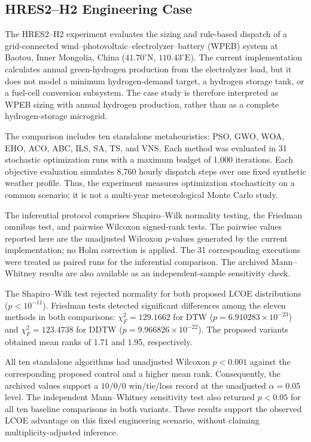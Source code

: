 
\subsection{HRES2--H2 Engineering Case}
\label{sec:statistical-hres2-en-revision}

The HRES2--H2 experiment evaluates the sizing and rule-based dispatch of a
grid-connected wind--photovoltaic--electrolyzer--battery (WPEB) system at
Baotou, Inner Mongolia, China ($41.70^\circ\mathrm{N}$,
$110.43^\circ\mathrm{E}$). The current implementation calculates annual
green-hydrogen production from the electrolyzer load, but it does not model a
minimum hydrogen-demand target, a hydrogen storage tank, or a fuel-cell
conversion subsystem. The case study is therefore interpreted as WPEB sizing
with annual hydrogen production, rather than as a complete hydrogen-storage
microgrid.

The comparison includes ten standalone metaheuristics: PSO, GWO, WOA, EHO,
ACO, ABC, ILS, SA, TS, and VNS. Each method was evaluated in 31 stochastic
optimization runs with a maximum budget of 1,000 iterations. Each objective
evaluation simulates 8,760 hourly dispatch steps over one fixed synthetic
weather profile. Thus, the experiment measures optimization stochasticity on
a common scenario; it is not a multi-year meteorological Monte Carlo study.

The inferential protocol comprises Shapiro--Wilk normality testing, the Friedman omnibus test, and pairwise Wilcoxon signed-rank tests. The pairwise values reported here are the unadjusted Wilcoxon $p$-values generated by the current implementation; no Holm correction is applied. The 31 corresponding executions were treated as paired runs for the inferential comparison.
The archived Mann--Whitney results are also available as an independent-sample
sensitivity check.

The Shapiro--Wilk test rejected normality for both proposed LCOE distributions
($p<10^{-11}$). Friedman tests detected significant differences among the
eleven methods in both comparisons: $\chi_F^2=129.1662$ for DTW
($p=6.910283\times10^{-23}$) and $\chi_F^2=123.4738$ for DDTW
($p=9.966826\times10^{-22}$). The proposed variants obtained mean ranks of
1.71 and 1.95, respectively.

All ten standalone algorithms had unadjusted Wilcoxon $p<0.001$ against the
corresponding proposed control and a higher mean rank. Consequently, the
archived values support a $10/0/0$ win/tie/loss record at the unadjusted
$\alpha=0.05$ level. The independent Mann--Whitney sensitivity test also
returned $p<0.05$ for all ten baseline comparisons in both variants. These
results support the observed LCOE advantage on this fixed engineering
scenario, without claiming multiplicity-adjusted inference.

